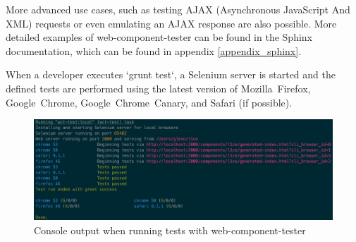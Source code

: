 More advanced use cases, such as testing AJAX (Asynchronous JavaScript And XML) requests
or even emulating an AJAX response are also possible.
More detailed examples of web-component-tester can be found in the Sphinx documentation,
which can be found in appendix \ref{appendix_sphinx}.

When a developer executes `grunt test`, a Selenium server is started and the
defined tests are performed using the latest version of Mozilla~Firefox,
Google~Chrome, Google~Chrome~Canary, and Safari (if possible).

\begin{figure}
  \centering
  \includegraphics[width=\textwidth]{images/grunt_test}
  \caption{Console output when running tests with web-component-tester}
  \label{fig:grunt_test}
\end{figure}
